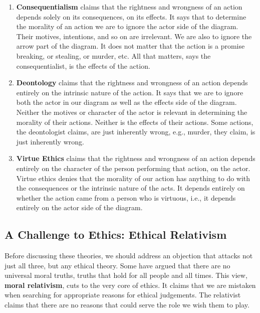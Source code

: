 \documentclass[]{article}
\begin{document}
\begin{enumerate}
\def\labelenumi{\arabic{enumi}.}
\itemsep1pt\parskip0pt
\item
  \textbf{Consequentialism} claims that the rightness and wrongness of
  an action depends solely on its consequences, on its effects. It says
  that to determine the morality of an action we are to ignore the actor
  side of the diagram. Their motives, intentions, and so on are
  irrelevant. We are also to ignore the arrow part of the diagram. It
  does not matter that the action is a promise breaking, or stealing, or
  murder, etc. All that matters, says the consequentialist, is the
  effects of the action.\\
\item
  \textbf{Deontology} claims that the rightness and wrongness of an
  action depends entirely on the intrinsic nature of the action. It says
  that we are to ignore both the actor in our diagram as well as the
  effects side of the diagram. Neither the motives or character of the
  actor is relevant in determining the morality of their actions.
  Neither is the effects of their actions. Some actions, the
  deontologist claims, are just inherently wrong, e.g., murder, they
  claim, is just inherently wrong.
\item
  \textbf{Virtue Ethics} claims that the rightness and wrongness of an
  action depends entirely on the character of the person performing that
  action, on the actor. Virtue ethics denies that the morality of our
  action has anything to do with the consequences or the intrinsic
  nature of the acts. It depends entirely on whether the action came
  from a person who is virtuous, i.e., it depends entirely on the actor
  side of the diagram.
\end{enumerate}

\subsection{A Challenge to Ethics: Ethical
Relativism}\label{a-challenge-to-ethics-ethical-relativism}

Before discussing these theories, we should address an objection that
attacks not just all three, but any ethical theory. Some have argued
that there are no universal moral truths, truths that hold for all
people and all times. This view, \textbf{moral relativism}, cuts to the
very core of ethics. It claims that we are mistaken when searching for
appropriate reasons for ethical judgements. The relativist claims that
there are no reasons that could serve the role we wish them to play.
\end{document}
